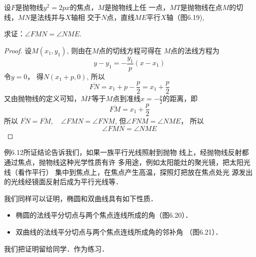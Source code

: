 \begin{example}
    设$F$是抛物线$y^2=2px$的焦点，$M$是抛物线上任
    一点，$MT$是抛物线在点$M$的切线，$MN$是法线并与$X$轴相
    交于$N$点，直线$ME$平行$X$轴（图6.19),
    
    求证：$\angle FMN=\angle NME$.
\end{example}

\begin{proof}
设$M(x_1,y_1)$, 则由在$M$点的切线方程可得在
$M$点的法线方程为
\[y-y_1=-\frac{y_1}{p}(x-x_1)\]
令$y=0$，
得$N(x_1+p,0)$, 
所以
\[\overline{FN}=x_1+p-\frac{p}{2}= x_1+\frac{p}{2}\]
又由抛物线的定义可知，$\overline{MF}$等于$M$点到准线$x=-\frac{p}{2}$的距离，即
\[\overline{FM}=x_1+\frac{p}{2}\]
所以
$\overline{FN}=\overline{FM},\quad \angle FMN=\angle FNM$, 
但$\angle FNM=\angle NME$，
所以
\[\angle FMN=\angle NME\]
\end{proof}

例6.12所证结论告诉我们，如果一族平行光线照射到抛物
线上，经抛物线反射都通过焦点，抛物线这种光学性质有许
多用途，例如太阳能灶的聚光镜，把太阳光线（看作平行）
集中到焦点上，在焦点产生高温，探照灯把放在焦点处光
源发出的光线经镜面反射后成为平行光线等．

我们同样可以证明，椭圆和双曲线具有如下性质．
\begin{itemize}
    \item 椭圆的法线平分切点与两个焦点连线所成的角（图6.20）．
    \item 双曲线的法线平分切点与两个焦点连线所成角的邻补角
（图6.21）．
\end{itemize}

我们把证明留给同学．作为练习．
    
